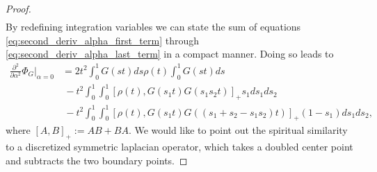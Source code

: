 \documentclass{article}
\newcommand{\brackets}[1]{\left[ #1 \right]}
\begin{document}
\begin{proof}
\begin{align}
\end{align}
By redefining integration variables we can state the sum of equations  \eqref{eq:second_deriv_alpha_first_term} through \eqref{eq:second_deriv_alpha_last_term} in a compact manner. Doing so leads to
\begin{align}
    \frac{\partial^2}{\partial \alpha^2} \Phi_G \bigg|_{\alpha = 0} &= 2 t^2 \int_0^1 G(st) ds \rho(t) \int_0^1 G(st) ds \label{eq:second_order_duhamel_one} \\
    &~ - t^2 \int_0^1 \int_0^1 \brackets{\rho(t) , G(s_1 t) G(s_1 s_2 t)}_+ s_1 ds_1 ds_2 \label{eq:second_order_duhamel_two}  \\
    &~ - t^2 \int_0^1 \int_0^1 \brackets{ \rho(t), G(s_1 t) G((s_1 + s_2 - s_1 s_2) t) }_+ (1-s_1) ds_1 ds_2, \label{eq:second_order_duhamel_three} 
\end{align}
where $[A,B]_+ := AB + BA$. We would like to point out the spiritual similarity to a discretized symmetric laplacian operator, which takes a doubled center point and subtracts the two boundary points.


\end{proof}
\end{document}
